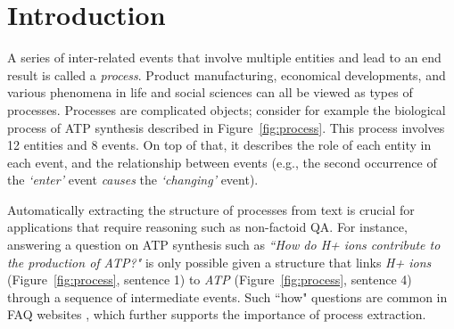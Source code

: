 \section{Introduction}

A series of inter-related events that involve multiple entities and lead to an end result is called a \emph{process}. Product manufacturing, economical developments, and various phenomena in life and social sciences can all be viewed as types of processes. Processes are complicated objects; consider for example the biological process of ATP synthesis described in Figure~\ref{fig:process}. This process involves 12 entities and 8 events. On top of that, it describes the role of each entity in each event, and the relationship between events (e.g., the second occurrence of the \textit{`enter'} event \textit{causes} the \textit{`changing'} event). 


Automatically extracting the structure of processes from text is crucial for applications that require reasoning such as non-factoid QA. For instance, answering a question on ATP synthesis such as \emph{``How do H+ ions contribute to the production of ATP?"} is only possible given a structure that links \emph{H+ ions} (Figure~\ref{fig:process}, sentence 1) to \emph{ATP} (Figure~\ref{fig:process}, sentence 4) through a sequence of intermediate events. Such ``how" questions are common in FAQ websites \cite{Surdeanu:2011}, which further supports the importance of process extraction.



